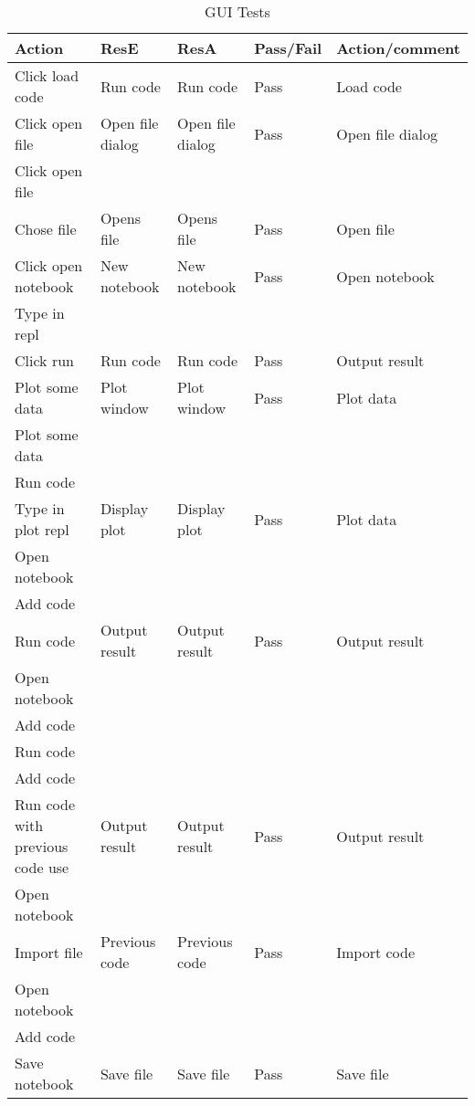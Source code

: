 \begin{table}[h]
    \caption{GUI Tests}
    \begin{tabular}{|p{1.8in}|p{0.5in}|p{0.4in}|p{0.6in}|p{1.4in}|} \hline
    Action & ResE & ResA& Pass/Fail & Action/comment \\ \hline \hline
        Click load code & Run code & Run code & Pass & Load code \\ \hline
        Click open file & Open file dialog & Open file dialog & Pass & Open file dialog \\ \hline
        Click open file & & & & \\ 
        Chose file & Opens file & Opens file & Pass & Open file \\ \hline
        Click open notebook & New notebook & New notebook & Pass & Open notebook \\ \hline
        Type in repl & & & & \\
        Click run & Run code & Run code & Pass & Output result \\ \hline
        Plot some data & Plot window & Plot window & Pass & Plot data \\ \hline
        Plot some data & & & & \\
        Run code & & & & \\
        Type in plot repl & Display plot & Display plot & Pass & Plot data \\ \hline
        Open notebook & & & & \\
        Add code & & & & \\
        Run code & Output result & Output result & Pass & Output result \\ \hline
        Open notebook & & & & \\
        Add code & & & & \\
        Run code & & & & \\
        Add code & & & & \\
        Run code with previous code use & Output result & Output result & Pass & Output result \\ \hline
        Open notebook & & & & \\
        Import file & Previous code & Previous code & Pass & Import code \\ \hline
        Open notebook & & & & \\
        Add code & & & & \\
        Save notebook & Save file & Save file & Pass & Save file \\ \hline
    \end{tabular}
    \label{tab:gui}
\end{table}

